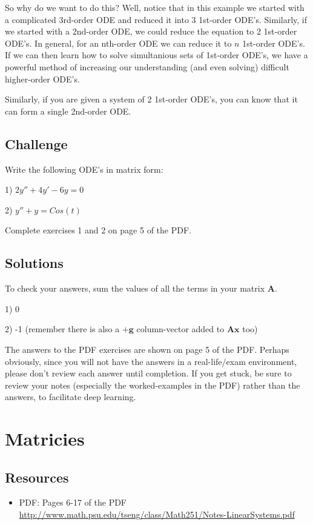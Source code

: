 So why do we want to do this? Well, notice that in this example we started with a complicated 3rd-order ODE and reduced it into 3 1st-order ODE's. Similarly, if we started with a 2nd-order ODE, we could reduce the equation to 2 1st-order ODE's. In general, for an nth-order ODE we can reduce it to $n$ 1st-order ODE's. If we can then learn how to solve simultanious sets of 1st-order ODE's, we have a powerful method of increasing our understanding (and even solving) difficult higher-order ODE's. 

Similarly, if you are given a system of 2 1st-order ODE's, you can know that it can form a single 2nd-order ODE. 

\subsection*{Challenge}
Write the following ODE's in matrix form:

1) $2 y'' + 4 y' - 6 y = 0$

2) $y'' + y = Cos(t)$

Complete exercises 1 and 2 on page 5 of the PDF.

\subsection*{Solutions}
To check your answers, sum the values of all the terms in your matrix $\bm{A}$.

1) 0

2) -1 (remember there is also a $+\bm{g}$ column-vector added to $\bm{A}\bm{x}$ too)

The answers to the PDF exercises are shown on page 5 of the PDF. Perhaps obviously, since you will not have the answers in a real-life/exam environment, please don't review each answer until completion. If you get stuck, be sure to review your notes (especially the worked-examples in the PDF) rather than the answers, to facilitate deep learning. 




\newpage
%
\section{Matricies}

\subsection*{Resources}
\begin{itemize}
    \item PDF: Pages 6-17 of the PDF \url{http://www.math.psu.edu/tseng/class/Math251/Notes-LinearSystems.pdf}
\end{itemize}

